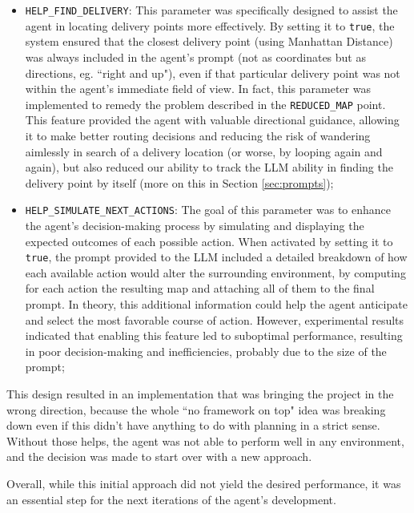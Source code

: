 \begin{itemize}
  \item \texttt{HELP\_FIND\_DELIVERY}: This parameter was specifically designed to
    assist the agent in locating delivery points more effectively. By setting it
    to \texttt{true}, the system ensured that the closest delivery point (using Manhattan
    Distance) was always included in the agent's prompt (not as coordinates but as
    directions, eg. ``right and up"), even if that particular delivery point was
    not within the agent's immediate field of view. In fact, this parameter was
    implemented to remedy the problem described in the \texttt{REDUCED\_MAP} point.
    This feature provided the agent with valuable directional guidance, allowing
    it to make better routing decisions and reducing the risk of wandering aimlessly
    in search of a delivery location (or worse, by looping again and again), but
    also reduced our ability to track the LLM ability in finding the delivery point
    by itself (more on this in Section \ref{sec:prompts});

  \item \texttt{HELP\_SIMULATE\_NEXT\_ACTIONS}: The goal of this parameter was to
    enhance the agent's decision-making process by simulating and displaying the
    expected outcomes of each possible action. When activated by setting it to
    \texttt{true}, the prompt provided to the LLM included a detailed breakdown
    of how each available action would alter the surrounding environment, by computing
    for each action the resulting map and attaching all of them to the final prompt.
    In theory, this additional information could help the agent anticipate and select
    the most favorable course of action. However, experimental results indicated
    that enabling this feature led to suboptimal performance, resulting in poor
    decision-making and inefficiencies, probably due to the size of the prompt;
\end{itemize}

This design resulted in an implementation that was bringing the project in the wrong
direction, because the whole ``no framework on top" idea was breaking down even if
this didn't have anything to do with planning in a strict sense. Without those
helps, the agent was not able to perform well in any environment, and the
decision was made to start over with a new approach.

Overall, while this initial approach did not yield the desired performance, it
was an essential step for the next iterations of the agent's development.

